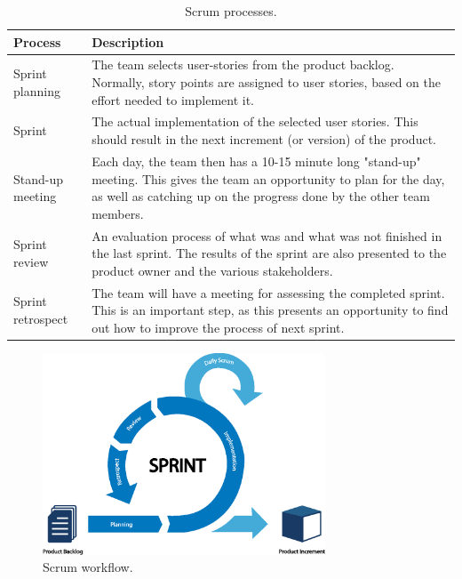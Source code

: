 \begin{table}[H]
    \centering
    \caption{Scrum processes.}
    \label{tab:scrum-processes}
    \begin{tabularx}{\textwidth}{|l|X|}
        \hline
        \textbf{Process} & \textbf{Description}\\
        \hline
        Sprint planning & The team selects user-stories from the product backlog. Normally, story points are assigned to user stories, based on the effort needed to implement it.\\
        \hline
        Sprint & The actual implementation of the selected user stories. This should result in the next increment (or version) of the product.\\
        \hline
        Stand-up meeting & Each day, the team then has a 10-15 minute long "stand-up" meeting. This gives the team an opportunity to plan for the day, as well as catching up on the progress done by the other team members.\\
        \hline
        Sprint review& An evaluation process of what was and what was not finished in the last sprint. The results of the sprint are also presented to the product owner and the various stakeholders.\\
        \hline
        Sprint retrospect & The team will have a meeting for assessing the completed sprint. This is an important step, as this presents an opportunity to find out how to improve the process of next sprint.\\
        \hline
    \end{tabularx}
\end{table}

\begin{figure}[ht]
    \centering
    \includegraphics[page=1,width=0.75\textwidth]{sections/theory/figures/scrum.eps}
    \caption{Scrum workflow.}
    \label{fig:scrum}
\end{figure}

